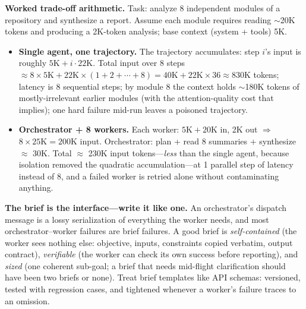 \textbf{Worked trade-off arithmetic.} Task: analyze 8 independent modules of a repository and synthesize a report. Assume each module requires reading $\sim$20K tokens and producing a 2K-token analysis; base context (system + tools) 5K.

\begin{itemize}
    \item \textbf{Single agent, one trajectory.} The trajectory accumulates: step $i$'s input is roughly $5\text{K} + i \cdot 22\text{K}$. Total input over 8 steps $\approx 8 \times 5\text{K} + 22\text{K} \times (1 + 2 + \cdots + 8) = 40\text{K} + 22\text{K} \times 36 \approx 830\text{K}$ tokens; latency is 8 sequential steps; by module 8 the context holds $\sim$180K tokens of mostly-irrelevant earlier modules (with the attention-quality cost that implies); one hard failure mid-run leaves a poisoned trajectory.
    \item \textbf{Orchestrator + 8 workers.} Each worker: $5\text{K} + 20\text{K}$ in, 2K out $\Rightarrow$ $8 \times 25\text{K} = 200\text{K}$ input. Orchestrator: plan + read 8 summaries + synthesize $\approx$ 30K. Total $\approx$ 230K input tokens---\textit{less} than the single agent, because isolation removed the quadratic accumulation---at 1 parallel step of latency instead of 8, and a failed worker is retried alone without contaminating anything.
\end{itemize}

\textbf{The brief is the interface---write it like one.} An orchestrator's dispatch message is a lossy serialization of everything the worker needs, and most orchestrator--worker failures are brief failures. A good brief is \textit{self-contained} (the worker sees nothing else: objective, inputs, constraints copied verbatim, output contract), \textit{verifiable} (the worker can check its own success before reporting), and \textit{sized} (one coherent sub-goal; a brief that needs mid-flight clarification should have been two briefs or none). Treat brief templates like API schemas: versioned, tested with regression cases, and tightened whenever a worker's failure traces to an omission.

